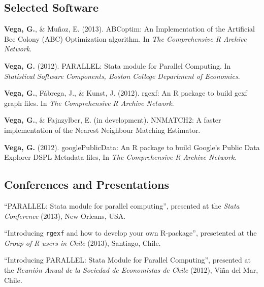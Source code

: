\documentclass[letterpaper, 11pt]{article}
\renewenvironment{itemize}{
  \begin{list}{}{
    \setlength{\leftmargin}{0.45cm}
  }
}{
  \end{list}
}
\begin{document}
\subsection*{Selected Software}
\begin{itemize}
\item {\bf Vega, G.}, \& Mu\~noz, E. (2013). ABCoptim: An Implementation of the Artificial Bee Colony (ABC) Optimization algorithm. In {\it The Comprehensive R Archive Network}.
\item {\bf Vega, G.} (2012). PARALLEL: Stata module for Parallel Computing. In {\it Statistical Software Components, Boston College Department of Economics}.
\item {\bf Vega, G.}, F\'abrega, J., \& Kunst, J. (2012). rgexf: An R package to build gexf graph files. In {\it The Comprehensive R Archive Network}.
\item {\bf Vega, G.}, \& Fajnzylber, E. (in development). NNMATCH2: A faster implementation of the Nearest Neighbour Matching Estimator.
\item {\bf Vega, G.} (2012). googlePublicData: An R package to build Google's Public Data Explorer DSPL Metadata files, In {\it The Comprehensive R Archive Network}.
\end{itemize}

\subsection*{Conferences and Presentations}

\begin{itemize}
\item ``PARALLEL: Stata module for parallel computing'', presented at the {\it Stata Conference} (2013), New Orleans, USA.
\item ``Introducing {\tt rgexf} and how to develop your own R-package'', presetented at the {\it Group of R users in Chile} (2013), Santiago, Chile.
\item ``Introducing PARALLEL: Stata Module for Parallel Computing'', presented at the {\it Reuni\'on Anual de la Sociedad de Economistas de Chile} (2012), Vi\~na del Mar, Chile.
\end{itemize}

\end{document}
